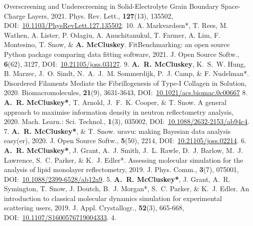 \begin{cvpubys}
    {Overscreening and Underscreening in Solid-Electrolyte Grain Boundary Space-Charge Layers,}
    {2021.}
    {Phys. Rev. Lett.,}
    {\textbf{127}(13), 135502,}
    {DOI:~\href{https://doi.org/10.1103/PhysRevLett.127.135502}{10.1103/PhysRevLett.127.135502}.}
    {10.}
  \cvpuby
    {A. Markvardsen*, T. Rees, M. Wathen, A. Lister, P. Odagiu, A. Anuchitanukul, T. Farmer, A. Lim, F. Montesino, T. Snow, \& \textbf{A. McCluskey}.}
    {FitBenchmarking: an open source Python package comparing data fitting software,}
    {2021.}
    {J. Open Source Softw.,}
    {\textbf{6}(62), 3127,}
    {DOI:~\href{https://doi.org/10.21105/joss.03127}{10.21105/joss.03127}.}
    {9.}
  \cvpuby
    {\textbf{A.~R. McCluskey}, K.~S.~W. Hung, B. Marzec, J.~O. Sindt, N.~A.~J.~M. Sommerdijk, P.~J. Camp, \& F. Nudelman*.}
    {Disordered Filaments Mediate the Fibrillogenesis of Type-I Collagen in Solution,}
    {2020.}
    {Biomacromolecules,}
    {\textbf{21}(9), 3631-3643,}
    {DOI:~\href{https://doi.org/10.1021/acs.biomac.0c00667}{10.1021/acs.biomac.0c00667}}
    {8.}
  \cvpuby
    {\textbf{A.~R. McCluskey*}, T. Arnold, J.~F.~K. Cooper, \& T. Snow.}
    {A general approach to maximise information density in neutron reflectometry analysis,}
    {2020.}
    {Mach. Learn.: Sci. Technol.,}
    {\textbf{1}(3), 035002,}
    {DOI:~\href{https://doi.org/10.1088/2632-2153/ab94c4}{10.1088/2632-2153/ab94c4}.}
    {7.}
  \cvpuby
    {\textbf{A.~R. McCluskey*}, \& T. Snow.}
    {uravu: making Bayesian data analysis easy(er),}
    {2020.}
    {J. Open Source Softw.,}
    {\textbf{5}(50), 2214,}
    {DOI:~\href{https://doi.org/10.21105/joss.02214}{10.21105/joss.02214}.}
    {6.}
  \cvpuby
    {\textbf{A.~R. McCluskey*}, J. Grant, A.~J. Smith, J.~L. Rawle, D.~J. Barlow, M.~J. Lawrence, S.~C. Parker, \& K.~J. Edler*.}
    {Assessing molecular simulation for the analysis of lipid monolayer reflectometry,}
    {2019.}
    {J. Phys. Comm.,}
    {\textbf{3}(7), 075001,}
    {DOI:~\href{https://doi.org/10.1088/2399-6528/ab12a9}{10.1088/2399-6528/ab12a9}.}
    {5.}
  \cvpuby
    {\textbf{A.~R. McCluskey*}, J. Grant, A.~R. Symington, T. Snow, J. Doutch, B.~J. Morgan*, S.~C. Parker, \& K.~J. Edler.}
    {An introduction to classical molecular dynamics simulation for experimental scattering users,}
    {2019.}
    {J. Appl. Crystallogr.,}
    {\textbf{52}(3), 665-668,}
    {DOI:~\href{https://doi.org/10.1107/S1600576719004333}{10.1107/S1600576719004333}.}
    {4.}
\end{cvpubys}

